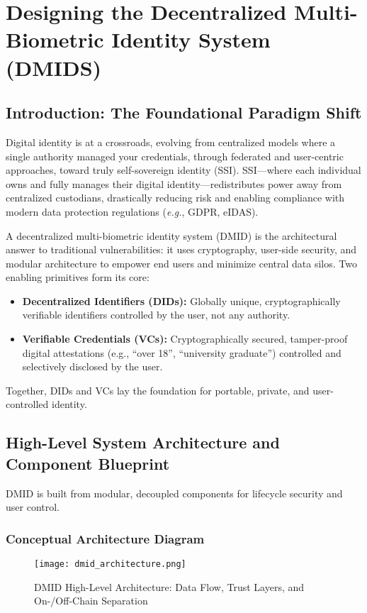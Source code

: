 \chapter{Designing the Decentralized Multi-Biometric Identity System (DMIDS)}

\section{Introduction: The Foundational Paradigm Shift}
Digital identity is at a crossroads, evolving from centralized models where a single authority managed your credentials, through federated and user-centric approaches, toward truly self-sovereign identity (SSI). SSI—where each individual owns and fully manages their digital identity—redistributes power away from centralized custodians, drastically reducing risk and enabling compliance with modern data protection regulations (\emph{e.g.}, GDPR, eIDAS).

A decentralized multi-biometric identity system (DMID) is the architectural answer to traditional vulnerabilities: it uses cryptography, user-side security, and modular architecture to empower end users and minimize central data silos. Two enabling primitives form its core:
\begin{itemize}
    \item \textbf{Decentralized Identifiers (DIDs):} Globally unique, cryptographically verifiable identifiers controlled by the user, not any authority.
    \item \textbf{Verifiable Credentials (VCs):} Cryptographically secured, tamper-proof digital attestations (e.g., ``over 18'', ``university graduate'') controlled and selectively disclosed by the user.
\end{itemize}
Together, DIDs and VCs lay the foundation for portable, private, and user-controlled identity.

\section{High-Level System Architecture and Component Blueprint}
DMID is built from modular, decoupled components for lifecycle security and user control.

\subsection{Conceptual Architecture Diagram}
\begin{figure}[h]
    \centering
    \texttt{[image: dmid\_architecture.png]}
    \caption{DMID High-Level Architecture: Data Flow, Trust Layers, and On-/Off-Chain Separation}
\end{figure}

